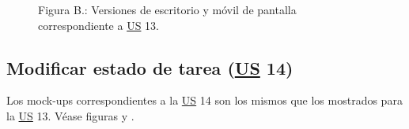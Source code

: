 \documentclass[a4paper, 12pt,twoside]{report}  %
\numberwithin{equation}{subsection} %
\begin{document}
\begin{figure}[H] 
	\centering
	\hfill%
	\caption*{Figura B.: Versiones de escritorio y móvil de pantalla correspondiente a \hyperlink{US}{US} 13.}
\end{figure}

\pagebreak


\subsection*{Modificar estado de tarea (\hyperlink{US}{US} 14)}

Los mock-ups correspondientes a la \hyperlink{US}{US} 14 son los mismos que los mostrados para la \hyperlink{US}{US} 13. Véase figuras  y .
\end{document}
